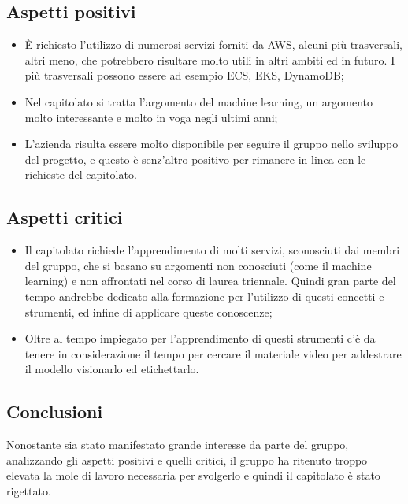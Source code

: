 \subsection{Aspetti positivi}
\begin{itemize}
\item \`E richiesto l'utilizzo di numerosi servizi forniti da AWS, alcuni più trasversali, altri meno, che potrebbero risultare molto utili in altri ambiti ed in futuro. I più trasversali possono essere ad esempio ECS, EKS, DynamoDB;
\item Nel capitolato si tratta l'argomento del machine learning, un argomento molto interessante e molto in voga negli ultimi anni;
\item L'azienda risulta essere molto disponibile per seguire il gruppo nello sviluppo del progetto, e questo è senz'altro positivo per rimanere in linea con le richieste del capitolato.
\end{itemize}

\subsection{Aspetti critici}
\begin{itemize}
\item Il capitolato richiede l'apprendimento di molti servizi, sconosciuti dai membri del gruppo, che si basano su argomenti non conosciuti (come il machine learning) e non affrontati nel corso di laurea triennale. Quindi gran parte del tempo andrebbe dedicato alla formazione per l'utilizzo di questi concetti e strumenti, ed infine di applicare queste conoscenze;
\item Oltre al tempo impiegato per l'apprendimento di questi strumenti c'è da tenere in considerazione il tempo per cercare il materiale video per addestrare il modello visionarlo ed etichettarlo.
\end{itemize}

\subsection{Conclusioni}
Nonostante sia stato manifestato grande interesse da parte del gruppo, analizzando gli aspetti positivi e quelli critici, il gruppo ha ritenuto troppo elevata la mole di lavoro necessaria per svolgerlo e quindi il capitolato è stato rigettato.

